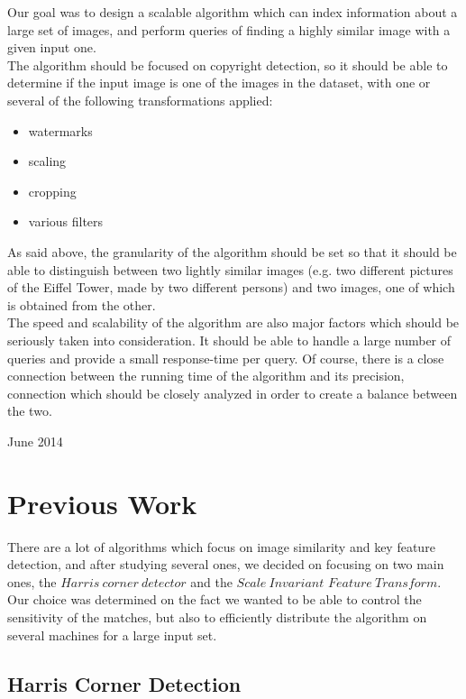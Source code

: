 \documentclass[conference]{IEEEtran}
\begin{document}
Our goal was to design a scalable algorithm which can index information about a large set of images, and perform queries of finding a highly similar image with a given input one. \\
The algorithm should be focused on copyright detection, so it should be able to determine if the input image is one of the images in the dataset, with one or several of the following transformations applied:
\begin{itemize}
	\item watermarks
	\item scaling
	\item cropping
	\item various filters
\end{itemize}

As said above, the granularity of the algorithm should be set so that it should be able to distinguish between two lightly similar images (e.g. two different pictures of the Eiffel Tower, made by two different persons) and two images, one of which is obtained from the other.\\

The speed and scalability of the algorithm are also major factors which should be seriously taken into consideration. It should be able to handle a large number of queries and provide a small response-time per query. Of course, there is a close connection between the running time of the algorithm and its precision, connection which should be closely analyzed in order to create a balance between the two.
 
\hfill June 2014

\section{Previous Work}

There are a lot of algorithms which focus on image similarity and key feature detection, and after studying several ones, we decided on focusing on two main ones, the $Harris\ corner\ detector$ and the $Scale\ Invariant$ $Feature\ Transform$. Our choice was determined on the fact we wanted to be able to control the sensitivity of the matches, but also to efficiently distribute the algorithm on several machines for a large input set. \\


\subsection{Harris Corner Detection}
\end{document}
